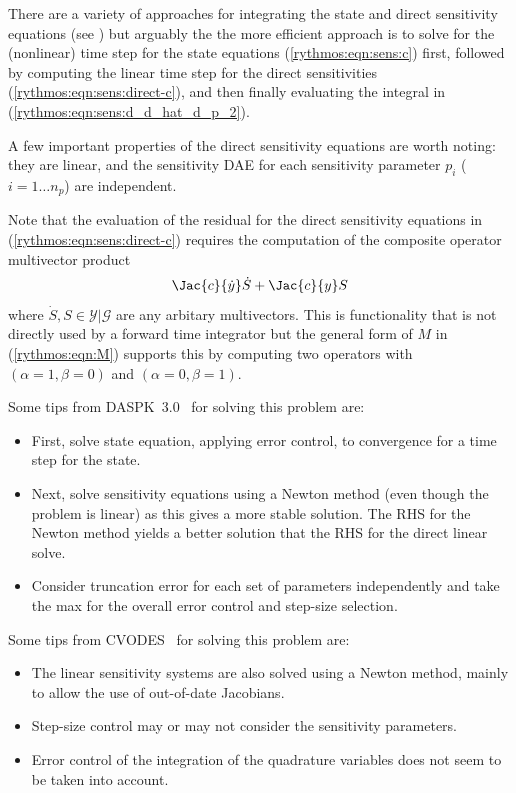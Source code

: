 \documentclass[pdf,ps2pdf,11pt]{SANDreport}
\begin{document}
There are a variety of approaches for integrating the state and direct
sensitivity equations (see {}\cite{cvodes}) but arguably the the more
efficient approach is to solve for the (nonlinear) time step for the state
equations (\ref{rythmos:eqn:sens:c}) first, followed by computing the linear
time step for the direct sensitivities (\ref{rythmos:eqn:sens:direct-c}), and
then finally evaluating the integral in
(\ref{rythmos:eqn:sens:d_d_hat_d_p_2}).

A few important properties of the direct sensitivity equations are worth
noting: they are linear, and the sensitivity DAE for each sensitivity
parameter $p_i$ ($i=1\ldots{}n_p$) are independent.

Note that the evaluation of the residual for the direct sensitivity equations
in (\ref{rythmos:eqn:sens:direct-c}) requires the computation of the composite
operator multivector product
%
\[
\Jac{c}{\dot{y}} \dot{S} + \Jac{c}{y} S
\]
%
where $\dot{S}, S {}\in\mathcal{Y}|\mathcal{G}$ are any arbitary multivectors.
This is functionality that is not directly used by a forward time integrator
but the general form of $M$ in (\ref{rythmos:eqn:M}) supports this by
computing two operators with $(\alpha=1,\beta=0)$ and $(\alpha=0,\beta=1)$.

Some tips from DASPK~3.0~\cite{new-daspk} for solving this problem are:
\begin{itemize}
%
{}\item First, solve state equation, applying error control, to convergence for a
time step for the state.
%
{}\item Next, solve sensitivity equations using a Newton method (even though the problem
is linear) as this gives a more stable solution.  The RHS for the Newton method yields
a better solution that the RHS for the direct linear solve.
%
{}\item Consider truncation error for each set of parameters independently and take
the max for the overall error control and step-size selection.
%
\end{itemize}

Some tips from CVODES~\cite{cvodes} for solving this problem are:
\begin{itemize}
%
{}\item The linear sensitivity systems are also solved using a Newton method,
mainly to allow the use of out-of-date Jacobians.
%
{}\item Step-size control may or may not consider the sensitivity parameters.
%
{}\item Error control of the integration of the quadrature variables does
not seem to be taken into account.
%
\end{itemize}
\end{document}
